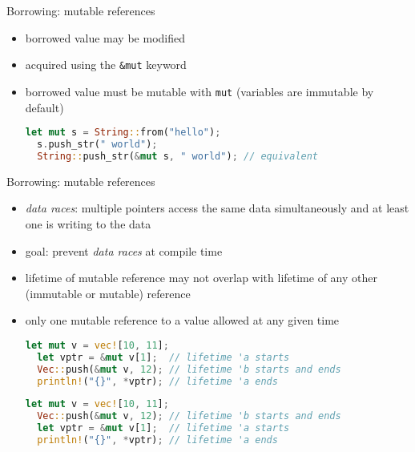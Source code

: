 \documentclass[handout]{beamer}
\begin{document}
\begin{frame}[fragile]{Borrowing: mutable references}
\begin{itemize}
  \item borrowed value may be modified
  \item acquired using the \verb|&mut| keyword
  \item borrowed value must be mutable with \verb|mut| (variables are immutable by default)

  \begin{lstlisting}[language=Rust]
  let mut s = String::from("hello");
  s.push_str(" world");
  String::push_str(&mut s, " world"); // equivalent
  \end{lstlisting}
\end{itemize}
\end{frame}


\begin{frame}[fragile]{Borrowing: mutable references}
\begin{itemize}
  \item \emph{data races}: multiple pointers access the same data simultaneously and at least one is writing to the data
  \item goal: prevent \emph{data races} at compile time
  \item lifetime of mutable reference may not overlap with lifetime of any other (immutable or mutable) reference
  \item only one mutable reference to a value allowed at any given time

  \begin{lstlisting}[language=Rust]
  let mut v = vec![10, 11];
  let vptr = &mut v[1];  // lifetime 'a starts
  Vec::push(&mut v, 12); // lifetime 'b starts and ends
  println!("{}", *vptr); // lifetime 'a ends
  \end{lstlisting}
  \pause
  \begin{lstlisting}[language=Rust]
  let mut v = vec![10, 11];
  Vec::push(&mut v, 12); // lifetime 'b starts and ends
  let vptr = &mut v[1];  // lifetime 'a starts
  println!("{}", *vptr); // lifetime 'a ends
  \end{lstlisting}
\end{itemize}
\end{frame}
\end{document}
